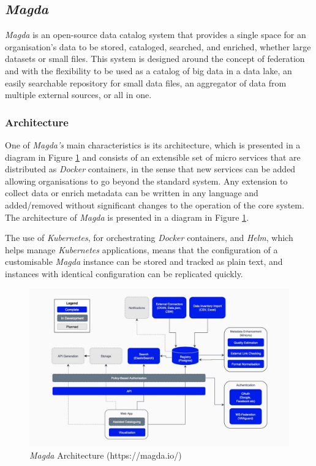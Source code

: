 \subsection{\textit{Magda}}
  
\textit{Magda} is an open-source data catalog system that provides a single space for an organisation's data to be stored, cataloged, searched, and enriched, whether large datasets or small files. This system is designed around the concept of federation and with the flexibility to be used as a catalog of big data in a data lake, an easily searchable repository for small data files, an aggregator of data from multiple external sources, or all in one.
  
\subsubsection{Architecture}
  
One of \textit{Magda's} main characteristics is its architecture, which is presented in a diagram in Figure \ref{fig:magda_arch} and consists of an extensible set of micro services that are distributed as \textit{Docker} containers, in the sense that new services can be added allowing organisations to go beyond the standard system. Any extension to collect data or enrich metadata can be written in any language and added/removed without significant changes to the operation of the core system. The architecture of \textit{Magda} is presented in a diagram in Figure \ref{fig:magda_arch}.
  
The use of \textit{Kubernetes}, for orchestrating \textit{Docker} containers, and \textit{Helm}, which helps manage \textit{Kubernetes} applications, means that the configuration of a customisable \textit{Magda} instance can be stored and tracked as plain text, and instances with identical configuration can be replicated quickly.
  
  
\begin{figure}[!h]
    \centering
    \includegraphics[width=1\textwidth]{img/state_of_the_art/architecture_magda.jpg}
    \caption{\textit{Magda} Architecture (https://magda.io/)}
    \label{fig:magda_arch}
\end{figure}  
  
